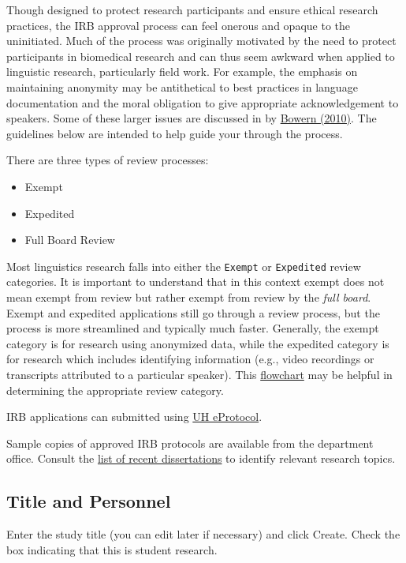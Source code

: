 \documentclass[
]{book}
\providecommand{\tightlist}{%
  \setlength{\itemsep}{0pt}\setlength{\parskip}{0pt}}
\begin{document}
Though designed to protect research participants and ensure ethical research practices, the IRB approval process can feel onerous and opaque to the uninitiated. Much of the process was originally motivated by the need to protect participants in biomedical research and can thus seem awkward when applied to linguistic research, particularly field work. For example, the emphasis on maintaining anonymity may be antithetical to best practices in language documentation and the moral obligation to give appropriate acknowledgement to speakers. Some of these larger issues are discussed in by \href{https://www.jstor.org/stable/40961721}{Bowern (2010)}. The guidelines below are intended to help guide your through the process.

There are three types of review processes:

\begin{itemize}
\tightlist
\item
  Exempt
\item
  Expedited
\item
  Full Board Review
\end{itemize}

Most linguistics research falls into either the \texttt{Exempt} or \texttt{Expedited} review categories. It is important to understand that in this context exempt does not mean exempt from review but rather exempt from review by the \emph{full board}. Exempt and expedited applications still go through a review process, but the process is more streamlined and typically much faster. Generally, the exempt category is for research using anonymized data, while the expedited category is for research which includes identifying information (e.g., video recordings or transcripts attributed to a particular speaker). This \href{files/irb_flowchart.pdf}{flowchart} may be helpful in determining the appropriate review category.

IRB applications can submitted using \href{https://uhmanoa.keyusa.net/}{UH eProtocol}.

Sample copies of approved IRB protocols are available from the department office. Consult the \href{https://hdl.handle.net/10125/2092}{list of recent dissertations} to identify relevant research topics.

\subsection{Title and Personnel}\label{title-and-personnel}

Enter the study title (you can edit later if necessary) and click Create. Check the box indicating that this is student research.
\end{document}
